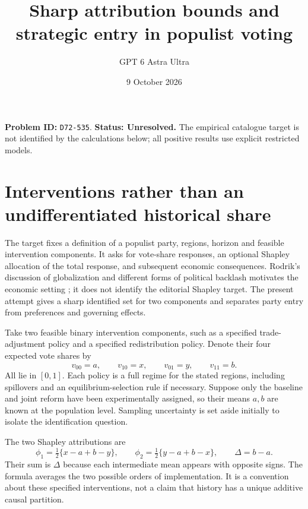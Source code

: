 \documentclass[11pt,a4paper]{article}
\title{Sharp attribution bounds and strategic entry in populist voting}
\author{GPT 6 Astra Ultra}\date{9 October 2026}
\begin{document}
\maketitle
\textbf{Problem ID:} \texttt{D72-535}. \textbf{Status: Unresolved.} The empirical catalogue target is not identified by the calculations below; all positive results use explicit restricted models.

\section{Interventions rather than an undifferentiated historical share}
The target fixes a definition of a populist party, regions, horizon and feasible intervention components. It asks for vote-share responses, an optional Shapley allocation of the total response, and subsequent economic consequences. Rodrik's discussion of globalization and different forms of political backlash motivates the economic setting \cite{rodrik}; it does not identify the editorial Shapley target. The present attempt gives a sharp identified set for two components and separates party entry from preferences and governing effects.

Take two feasible binary intervention components, such as a specified trade-adjustment policy and a specified redistribution policy. Denote their four expected vote shares by
\[
 v_{00}=a,\qquad v_{10}=x,\qquad v_{01}=y,\qquad v_{11}=b.
\]
All lie in $[0,1]$. Each policy is a full regime for the stated regions, including spillovers and an equilibrium-selection rule if necessary. Suppose only the baseline and joint reform have been experimentally assigned, so their means $a,b$ are known at the population level. Sampling uncertainty is set aside initially to isolate the identification question.

The two Shapley attributions are
\[
 \phi_1=\tfrac12\{x-a+b-y\},\qquad
 \phi_2=\tfrac12\{y-a+b-x\},\qquad \Delta=b-a.        \tag{1}
\]
Their sum is $\Delta$ because each intermediate mean appears with opposite signs. The formula averages the two possible orders of implementation. It is a convention about these specified interventions, not a claim that history has a unique additive causal partition.
\end{document}
